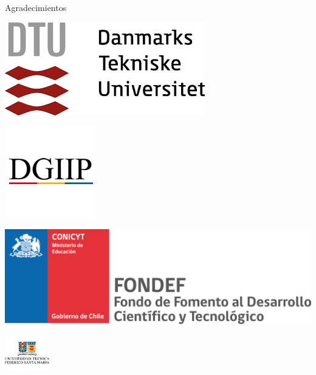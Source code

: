 \documentclass[mathserif,10pt]{beamer}
\begin{document}
\begin{frame}{Agradecimientos}
	\vspace{-0.5cm}
	\begin{minipage}{0.5\linewidth}
		\centering
		\includegraphics[width=0.9\linewidth]{fig/agrad/dtu}%
	\end{minipage}%
	\begin{minipage}{0.5\linewidth}
		\centering
		\includegraphics[width=0.6\linewidth]{fig/agrad/dgiip}%
	\end{minipage}%
	
	\vspace{0.7cm}
	\centering
	\includegraphics[width=0.7\linewidth]{fig/agrad/conicyt}%
	
\end{frame}

\begin{frame}
	\vspace{0.3cm}
	\begin{center} \includegraphics[height=1.5cm]{utfsm_logo} \end{center}
	\vspace{-0.5cm}
	\titlepage
\end{frame}
\end{document}
